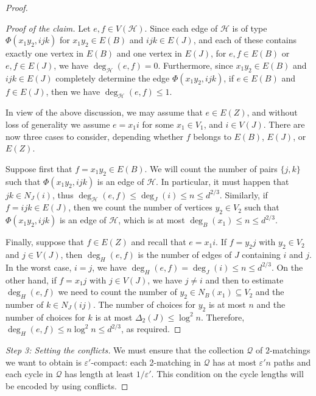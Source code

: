 \documentclass[a4paper, 11pt,reqno]{amsart}
\newcommand{\calH}{\mathcal{H}}
\newcommand{\calQ}{\mathcal{Q}}
\theoremstyle{plain}
\theoremstyle{definition}
\numberwithin{equation}{section}
\newcommand{\eps}{\varepsilon}
\newenvironment{proofclaim}[1][Proof of the claim]{\begin{proof}[#1]\renewcommand*{\qedsymbol}{\(\square\)}}{\end{proof}}
\renewcommand*{\qedsymbol}{\(\blacksquare\)}
\begin{document}
\begin{proof}
\begin{proofclaim}
	Let $e, f \in V(\mathcal{H})$.  Since each edge of $\mathcal{H}$
	is of type $\Phi(x_1 y_2, ijk)$ for $x_1 y_2 \in E(B)$ and $ijk
	\in E(J)$, and each of these contains exactly one vertex in $E(B)$
	and one vertex in $E(J)$, for $e,f\in E(B)$ or $e,f \in E(J)$, we
	have $\deg_{\mathcal{H}}(e, f) = 0$.  Furthermore, since $x_1 y_2
	\in E(B)$ and $ijk \in E(J)$ completely determine the edge
	$\Phi(x_1 y_2, ijk)$, if $e \in E(B)$ and $f \in E(J)$, then
	we have $\deg_{\mathcal{H}}(e,f) \leq 1$.
	
	In view of the above discussion, we may assume that $e \in E(Z)$,
	and without loss of generality we assume $e=x_1i$ for some $x_1
	\in V_1$, and $i \in V(J)$.  There are now three cases to
	consider, depending whether $f$ belongs to $E(B)$, $E(J)$, or
	$E(Z)$.
	
	Suppose first that $f = x_1 y_2 \in E(B)$. We will count the
	number of pairs $\{j,k\}$ such that $\Phi(x_1 y_2, ijk)$ is an edge of
	$\calH$.  In particular, it must happen that $jk \in N_J(i)$,
	thus $\deg_{\mathcal{H}}(e, f) \leq \deg_{J}(i) \leq n \leq
	d^{2/3}$.  Similarly, if $f = ijk \in E(J)$, then we count the
	number of vertices $y_2\in V_2$ such that $\Phi(x_1 y_2, ijk)$ is an edge of
	$\calH$, which is at most $\deg_B(x_1) \leq n \leq d^{2/3}$.
	
	Finally, suppose that $f \in E(Z)$ and recall that $e=x_1i$. If
	$f=y_2j$ with $y_2 \in V_2$ and $j \in V(J)$, then $\deg_{H}(e,
	f)$ is the number of edges of $J$ containing $i$ and $j$. In the
	worst case, $i = j$, we have $\deg_{H}(e, f) = \deg_{J}(i) \leq n
	\leq d^{2/3}$. On the other hand, if $f=x_1 j$ with $j \in V(J)$,
	we have $j \neq i$ and then to estimate $\deg_{H}(e, f)$ we need
	to count the number of $y_2 \in N_B(x_1) \subseteq V_2$ and the
	number of $k \in N_J(ij)$. The number of choices for $y_2$ is at
	most $n$ and the number of choices for $k$ is at most $\Delta_2(J)
	\leq \log^2 n$. Therefore, $\deg_{H}(e, f) \leq n \log^2 n \leq
	d^{2/3}$, as required.
\end{proofclaim}

\medskip

\noindent \emph{Step 3: Setting the conflicts.}
We must ensure that the collection $\calQ$ of $2$-matchings we want
to obtain is $\eps'$-compact: each 2-matching in $\calQ$ has at most 
$\eps' n$ paths and each cycle in $\calQ$ has length at least $1/\eps'$. 
This condition on the cycle lengths will be encoded by using conflicts.


\end{proof}
\end{document}
